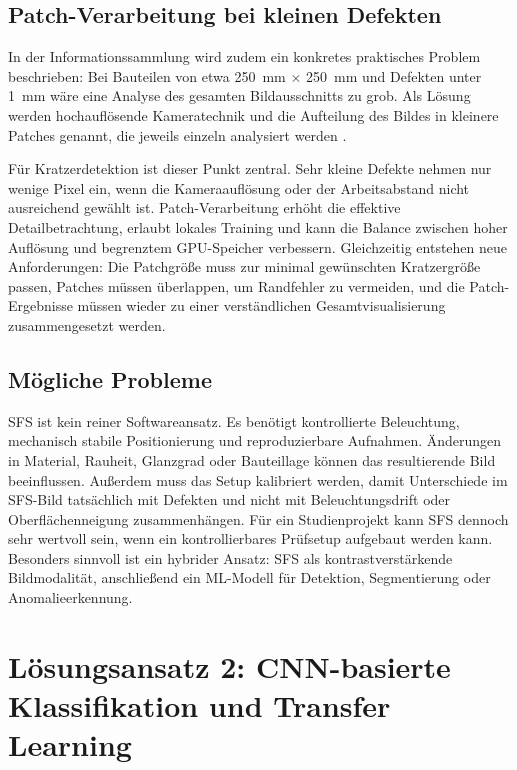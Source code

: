 \documentclass[11pt,a4paper]{article}
\begin{document}
\subsection{Patch-Verarbeitung bei kleinen Defekten}

In der Informationssammlung wird zudem ein konkretes praktisches Problem beschrieben: Bei Bauteilen von etwa \SI{250}{\milli\metre} $\times$ \SI{250}{\milli\metre} und Defekten unter \SI{1}{\milli\metre} wäre eine Analyse des gesamten Bildausschnitts zu grob. Als Lösung werden hochauflösende Kameratechnik und die Aufteilung des Bildes in kleinere Patches genannt, die jeweils einzeln analysiert werden \cite{ersteinfos}. 

Für Kratzerdetektion ist dieser Punkt zentral. Sehr kleine Defekte nehmen nur wenige Pixel ein, wenn die Kameraauflösung oder der Arbeitsabstand nicht ausreichend gewählt ist. Patch-Verarbeitung erhöht die effektive Detailbetrachtung, erlaubt lokales Training und kann die Balance zwischen hoher Auflösung und begrenztem GPU-Speicher verbessern. Gleichzeitig entstehen neue Anforderungen: Die Patchgröße muss zur minimal gewünschten Kratzergröße passen, Patches müssen überlappen, um Randfehler zu vermeiden, und die Patch-Ergebnisse müssen wieder zu einer verständlichen Gesamtvisualisierung zusammengesetzt werden.

\subsection{Mögliche Probleme}

SFS ist kein reiner Softwareansatz. Es benötigt kontrollierte Beleuchtung, mechanisch stabile Positionierung und reproduzierbare Aufnahmen. Änderungen in Material, Rauheit, Glanzgrad oder Bauteillage können das resultierende Bild beeinflussen. Außerdem muss das Setup kalibriert werden, damit Unterschiede im SFS-Bild tatsächlich mit Defekten und nicht mit Beleuchtungsdrift oder Oberflächenneigung zusammenhängen. Für ein Studienprojekt kann SFS dennoch sehr wertvoll sein, wenn ein kontrollierbares Prüfsetup aufgebaut werden kann. Besonders sinnvoll ist ein hybrider Ansatz: SFS als kontrastverstärkende Bildmodalität, anschließend ein ML-Modell für Detektion, Segmentierung oder Anomalieerkennung.

\section{Lösungsansatz 2: CNN-basierte Klassifikation und Transfer Learning}
\end{document}
